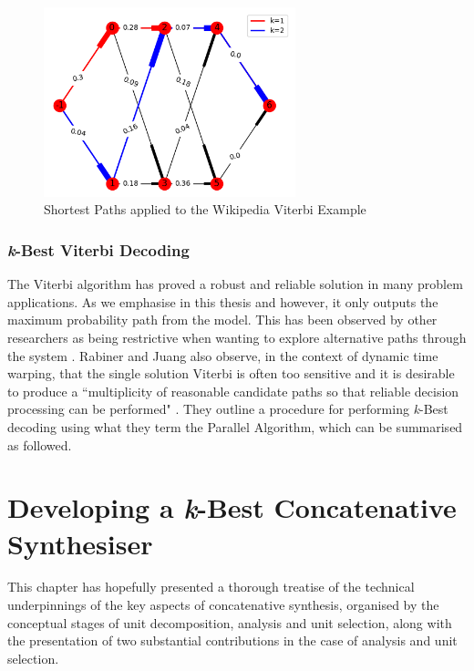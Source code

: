 {{{{{{{{\begin{figure}
	\begin{center}
		\includegraphics[width=0.65\textwidth]{ch05_pyconcat/figures/wiki_hmm.png}
	\end{center}
	\caption[Shortest Paths applied to the Wikipedia Viterbi Example]{Shortest Paths applied to the Wikipedia Viterbi Example}
	\label{fig:graph_hmm}
\end{figure}

\subsubsection{\textit{k}-Best Viterbi Decoding}

The Viterbi algorithm has proved a robust and reliable solution in many problem applications. As we emphasise in this thesis and \citep{Nuanain2017} however, it only outputs the maximum probability path from the model. This has been observed by other researchers as being restrictive when wanting to explore alternative paths through the system \citep{Schwarz2003, Brown2010}. Rabiner and Juang also observe, in the context of dynamic time warping, that the single solution Viterbi is often too sensitive and it is desirable to produce a ``multiplicity of reasonable candidate paths so that reliable decision processing can be performed" \citep{Rabiner1993}. They outline a procedure for performing \textit{k}-Best decoding using what they term the Parallel Algorithm, which can be summarised as followed.

\section{Developing a \textit{k}-Best Concatenative Synthesiser}

This chapter has hopefully presented a thorough treatise of the technical underpinnings of the key aspects of concatenative synthesis, organised by the conceptual stages of unit decomposition, analysis and unit selection, along with the presentation of two substantial contributions in the case of analysis and unit selection.

}}}}}}}}
